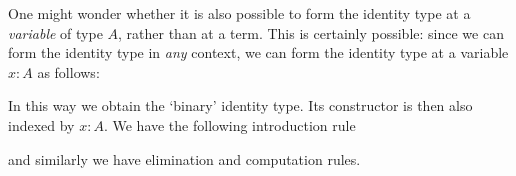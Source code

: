 \begin{rmk}
  One might wonder whether it is also possible to form the identity type at a \emph{variable} of type $A$, rather than at a term. This is certainly possible: since we can form the identity type in \emph{any} context, we can form the identity type at a variable $x:A$ as follows:
  \begin{prooftree}
  \end{prooftree}
  In this way we obtain the `binary' identity type. Its constructor is then also indexed by $x:A$. We have the following introduction rule
  \begin{prooftree}
  \end{prooftree}
  and similarly we have elimination and computation rules.
\end{rmk}
 

\begin{comment}
In the following lemma we show that the identity type on $A$ is contained in any reflexive relation on $A$.

\begin{lem}
Let $\Gamma,x:A,y:A\vdash R(x,y)~\mathrm{type}$\index{reflexive relation|textit}\index{relation!reflexive}, and suppose that $R$ is reflexive in the sense that there is a term
\begin{equation*}
\rho:\prd{x:A}R(x,x)
\end{equation*}
Then there is a term of type
\begin{equation*}
\prd{y:A} (x=_A y)\to R(x,y)
\end{equation*}
in context $\Gamma,x:A$.
\end{lem}

\begin{constr}
By weakening the reflexive relation $R$ we obtain
\begin{equation*}
\Gamma,x:A,y:A,\alpha:x=_A y\vdash R(x,y)~\mathrm{type},
\end{equation*}
on which the induction principle is applicable.
Thus we see that by the induction principle for identity types we have a term
\begin{equation*}
\mathsf{path\usc{}ind}_x : R(x,x)\to \prd{y:A}(x=_A y)\to R(x,y)
\end{equation*}
so it suffices to construct a term of type $R(x,x)$, which we have by reflexivity of $R$.
\end{constr}
\end{comment}

